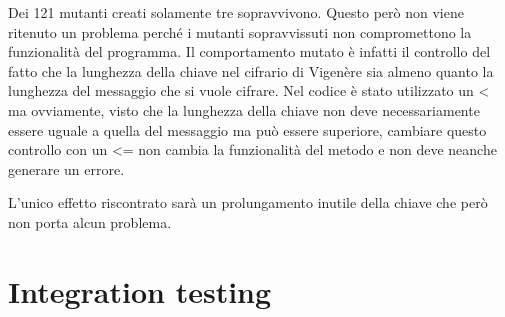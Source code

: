 		Dei 121 mutanti creati solamente tre sopravvivono. Questo però non viene ritenuto un problema perché i mutanti sopravvissuti non compromettono la funzionalità del programma. Il comportamento mutato è infatti il controllo del fatto che la lunghezza della chiave nel cifrario di Vigenère sia almeno quanto la lunghezza del messaggio che si vuole cifrare. Nel codice è stato utilizzato un < ma ovviamente, visto che la lunghezza della chiave non deve necessariamente essere uguale a quella del messaggio ma può essere superiore, cambiare questo controllo con un <= non cambia la funzionalità del metodo e non deve neanche generare un errore.
		
		L'unico effetto riscontrato sarà un prolungamento inutile della chiave che però non porta alcun problema.
		
	\section{Integration testing}